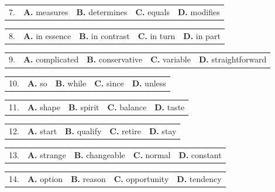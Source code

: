 \documentclass[UTF8,11pt]{ctexart}
\begin{document}
\noindent\begin{tabularx}{\linewidth}{@{}lXXXX@{}}7. & \textbf{A.} measures & \textbf{B.} determines & \textbf{C.} equals & \textbf{D.} modifies\\\end{tabularx}\par

\noindent\begin{tabularx}{\linewidth}{@{}lXXXX@{}}8. & \textbf{A.} in essence & \textbf{B.} in contrast & \textbf{C.} in turn & \textbf{D.} in part\\\end{tabularx}\par

\noindent\begin{tabularx}{\linewidth}{@{}lXXXX@{}}9. & \textbf{A.} complicated & \textbf{B.} conservative & \textbf{C.} variable & \textbf{D.} straightforward\\\end{tabularx}\par

\noindent\begin{tabularx}{\linewidth}{@{}lXXXX@{}}10. & \textbf{A.} so & \textbf{B.} while & \textbf{C.} since & \textbf{D.} unless\\\end{tabularx}\par

\noindent\begin{tabularx}{\linewidth}{@{}lXXXX@{}}11. & \textbf{A.} shape & \textbf{B.} spirit & \textbf{C.} balance & \textbf{D.} taste\\\end{tabularx}\par

\noindent\begin{tabularx}{\linewidth}{@{}lXXXX@{}}12. & \textbf{A.} start & \textbf{B.} qualify & \textbf{C.} retire & \textbf{D.} stay\\\end{tabularx}\par

\noindent\begin{tabularx}{\linewidth}{@{}lXXXX@{}}13. & \textbf{A.} strange & \textbf{B.} changeable & \textbf{C.} normal & \textbf{D.} constant\\\end{tabularx}\par

\noindent\begin{tabularx}{\linewidth}{@{}lXXXX@{}}14. & \textbf{A.} option & \textbf{B.} reason & \textbf{C.} opportunity & \textbf{D.} tendency\\\end{tabularx}\par
\end{document}
